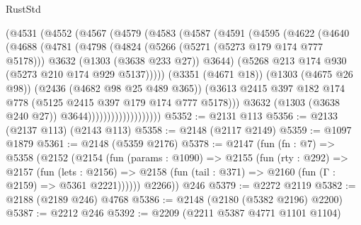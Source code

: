 \begin{lexlean}{RustStd}
\begin{coremodule}
                        (@4531
                          (@4552
                            (@4567
                              (@4579
                                (@4583
                                  (@4587
                                    (@4591
                                      (@4595
                                        (@4622
                                          (@4640
                                            (@4688
                                              (@4781
                                                (@4798
                                                  (@4824
                                                    (@5266 (@5271 (@5273 @179 @174 @777 @5178)))
                                                    @3632
                                                    (@1303 (@3638 @233 @27))
                                                    @3644)
                                                  (@5268
                                                    @213
                                                    @174
                                                    @930
                                                    (@5273 @210 @174 @929 @5137)))))
                                            (@3351 (@4671 @18))
                                            (@1303 (@4675 @26 @98))
                                            (@2436 (@4682 @98 @25 @489 @365))
                                            (@3613
                                              @2415
                                              @397
                                              @182
                                              @174
                                              @778
                                              (@5125 @2415 @397 @179 @174 @777 @5178)))
                                          @3632
                                          (@1303 (@3638 @240 @27))
                                          @3644)))))))))))))))))))
@5352 := @2131 @113
@5356 := @2133 (@2137 @113) (@2143 @113)
@5358 := @2148 (@2117 @2149)
@5359 := @1097 @1879
@5361 := @2148 (@5359 @2176)
@5378 := @2147
    (fun (fn : @7) =>
    @5358
      (@2152
        (@2154
          (fun (params : @1090) =>
          @2155
            (fun (rty : @292) =>
            @2157
              (fun (lets : @2156) =>
              @2158 (fun (tail : @371) => @2160 (fun (Γ : @2159) => @5361 @2221))))))
        @2266))
    @246
@5379 := @2272 @2119
@5382 := @2188 (@2189 @246) @4768
@5386 := @2148 (@2180 (@5382 @2196) @2200)
@5387 := @2212 @246
@5392 := @2209 (@2211 @5387 @4771 @1101 @1104)

\end{coremodule}
\end{lexlean}
